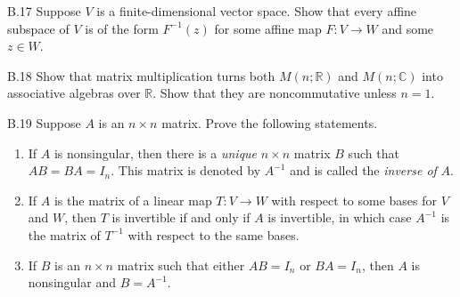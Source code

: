 \begin{exercise}{B.17}
    Suppose \( V \) is a finite-dimensional vector space. Show that every affine subspace of \( V \) is of the form \( F^{-1}(z) \) for some affine map \( F : V \to W \) and some \( z \in W \).
\end{exercise}

\begin{exercise}{B.18}
    Show that matrix multiplication turns both \( M(n; \mathbb{R}) \) and \( M(n; \mathbb{C}) \) into associative algebras over \( \mathbb{R} \). Show that they are noncommutative unless \( n = 1 \).
\end{exercise}

\begin{exercise}{B.19}
    Suppose \( A \) is an \( n \times n \) matrix. Prove the following statements.
    \begin{enumerate}[label={(\alph*)}]
        \item If \( A \) is nonsingular, then there is a \emph{unique} \( n \times n \) matrix \( B \) such that \( AB = BA = I_{n} \). This matrix is denoted by \( A^{-1} \) and is called the \emph{inverse of} \( A \).
        \item If \( A \) is the matrix of a linear map \( T : V \to W \) with respect to some bases for \( V \) and \( W \), then \( T \) is invertible if and only if \( A \) is invertible, in which case \( A^{-1} \) is the matrix of \( T^{-1} \) with respect to the same bases.
        \item If \( B \) is an \( n \times n \) matrix such that either \( AB = I_{n} \) or \( BA = I_{n} \), then \( A \) is nonsingular and \( B = A^{-1} \).
    \end{enumerate}
\end{exercise}

